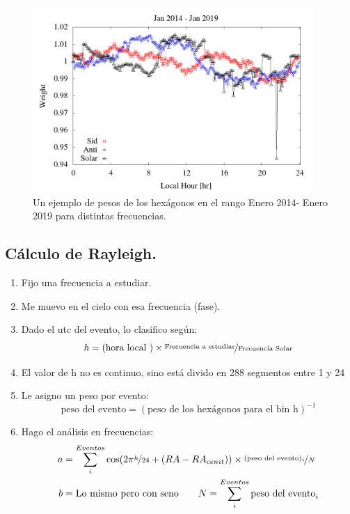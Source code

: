  


\begin{figure}[htbp]
  \centering
  \includegraphics[width=0.95\textwidth]{../../Plotting/Graficos/weigth2014-2019_jan.png}
  \caption{Un ejemplo de pesos de los hexágonos en el rango Enero 2014- Enero 2019 para distintas frecuencias.}
\end{figure}

 

\subsection{Cálculo de Rayleigh.}


 \begin{enumerate}
   \item Fijo una frecuencia a estudiar.
   \item Me muevo en el cielo con esa frecuencia (fase).
   \item Dado el utc del evento, lo clasifico según:
   \begin{equation*}
     h = (\text{hora local })\times \nicefrac{\text{Frecuencia a estudiar}}{\text{Frecuencia Solar}}
   \end{equation*}
     \item El valor de h no es continuo, sino está divido en 288 segmentos entre 1 y 24
  \item Le asigno un peso por evento:
   \begin{equation*}
     \text{peso del evento} = (\text{peso  de los hexágonos para el bin h})^{-1}
     \end{equation*} 
    \item Hago el análisis en frecuencias:
    \begin{align*}
        a &= \sum^{Eventos}_i \cos(2\pi \nicefrac{h}{24} + (RA -RA_{cenit}))\times \nicefrac{(\text{peso del evento})_i}{N}\\
        b &= \text{Lo mismo pero con seno}\qquad         N = \sum^{Eventos}_i \text{peso del evento}_i
    \end{align*}
 \end{enumerate}

